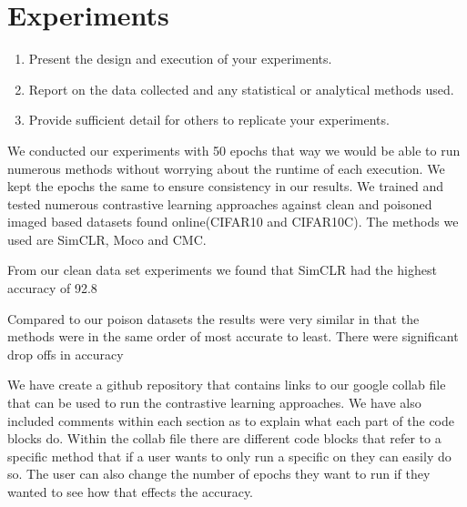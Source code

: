 \section{Experiments}

\begin{enumerate}
    \item Present the design and execution of your experiments.
    \item Report on the data collected and any statistical or analytical methods used.
    \item Provide sufficient detail for others to replicate your experiments.
\end{enumerate}

We conducted our experiments with 50 epochs that way we would be able to run numerous methods without worrying about the runtime of each execution. We kept the epochs the same to ensure consistency in our results. We trained and tested numerous contrastive learning approaches against clean and poisoned imaged based datasets found online(CIFAR10 and CIFAR10C). The methods we used are SimCLR, Moco and CMC. 

From our clean data set experiments we found that SimCLR had the highest accuracy of 92.8%

Compared to our poison datasets the results were very similar in that the methods were in the same order of most accurate to least. There were significant drop offs in accuracy %

We have create a github repository that contains links to our google collab file that can be used to run the contrastive learning approaches. We have also included comments within each section as to explain what each part of the code blocks do. Within the collab file there are different code blocks that refer to a specific method that if a user wants to only run a specific on they can easily do so. The user can also change the number of epochs they want to run if they wanted to see how that effects the accuracy.

